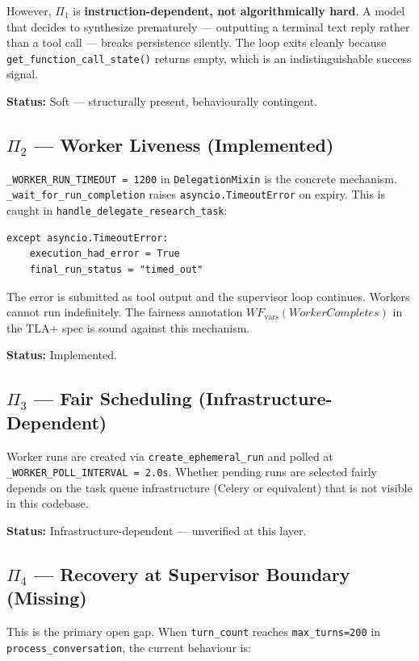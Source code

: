 However, $\Pi_1$ is \textbf{instruction-dependent, not algorithmically hard}.
A model that decides to synthesize prematurely — outputting a terminal text reply
rather than a tool call — breaks persistence silently. The loop exits cleanly
because \texttt{get\_function\_call\_state()} returns empty, which is an
indistinguishable success signal.

\textbf{Status:} Soft — structurally present, behaviourally contingent.

\subsection*{$\Pi_2$ — Worker Liveness (Implemented)}

\texttt{\_WORKER\_RUN\_TIMEOUT = 1200} in \texttt{DelegationMixin} is the
concrete mechanism. \texttt{\_wait\_for\_run\_completion} raises
\texttt{asyncio.TimeoutError} on expiry. This is caught in
\texttt{handle\_delegate\_research\_task}:

\begin{verbatim}
except asyncio.TimeoutError:
    execution_had_error = True
    final_run_status = "timed_out"
\end{verbatim}

The error is submitted as tool output and the supervisor loop continues.
Workers cannot run indefinitely. The fairness annotation $WF_{\text{vars}}(WorkerCompletes)$
in the TLA+ spec is sound against this mechanism.

\textbf{Status:} Implemented.

\subsection*{$\Pi_3$ — Fair Scheduling (Infrastructure-Dependent)}

Worker runs are created via \texttt{create\_ephemeral\_run} and polled at
\texttt{\_WORKER\_POLL\_INTERVAL = 2.0s}. Whether pending runs are selected
fairly depends on the task queue infrastructure (Celery or equivalent)
that is not visible in this codebase.

\textbf{Status:} Infrastructure-dependent — unverified at this layer.

\subsection*{$\Pi_4$ — Recovery at Supervisor Boundary (Missing)}

This is the primary open gap. When \texttt{turn\_count} reaches \texttt{max\_turns=200}
in \texttt{process\_conversation}, the current behaviour is:

